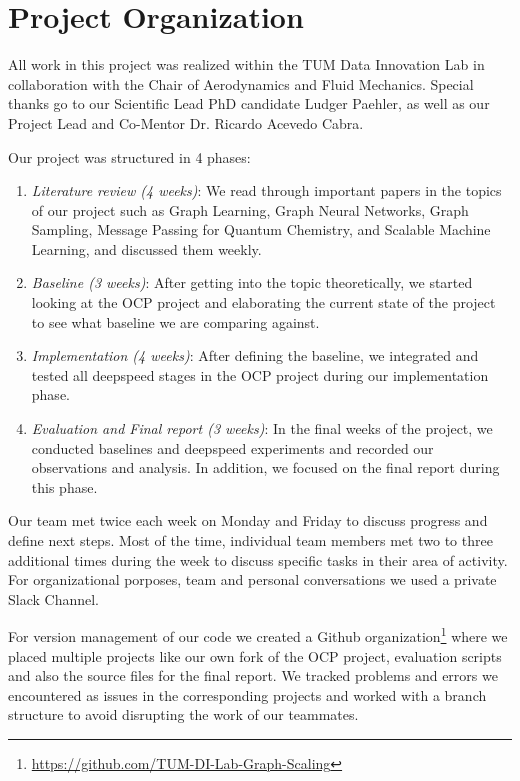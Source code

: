 \section{Project Organization}
\label{section:project_organization}

All work in this project was realized within the TUM Data Innovation Lab in collaboration with the Chair of 
Aerodynamics and Fluid Mechanics. Special thanks go to our Scientific Lead PhD candidate Ludger Paehler, 
as well as our Project Lead and Co-Mentor Dr. Ricardo Acevedo Cabra.

Our project was structured in 4 phases:

\begin{enumerate}
    \item \textit{Literature review (4 weeks)}: We read through important papers in the topics of our project such 
    as Graph Learning, Graph Neural Networks, Graph Sampling, Message Passing for Quantum Chemistry, 
    and Scalable Machine Learning, and discussed them weekly.
    \item \textit{Baseline (3 weeks)}: After getting into the topic theoretically, we started looking at the OCP 
    project and elaborating the current state of the project to see what baseline we are comparing against.
    \item \textit{Implementation (4 weeks)}: After defining the baseline, we integrated and tested all deepspeed 
    stages in the OCP project during our implementation phase.
    \item \textit{Evaluation and Final report (3 weeks)}: In the final weeks of the project, we conducted baselines 
    and deepspeed experiments and recorded our observations and analysis. In addition, we focused on the final 
    report during this phase.
\end{enumerate}

Our team met twice each week on Monday and Friday to discuss progress and define next steps. Most of 
the time, individual team members met two to three additional times during the week to discuss specific 
tasks in their area of activity. For organizational porposes, team and personal conversations we used 
a private Slack Channel.

For version management of our code we created a Github organization\footnote{\url{https://github.com/TUM-DI-Lab-Graph-Scaling}} 
where we placed multiple projects like our own fork of the OCP project, evaluation scripts and also 
the source files for the final report. We tracked problems and errors we encountered as issues in the 
corresponding projects and worked with a branch structure to avoid disrupting the work of our teammates.